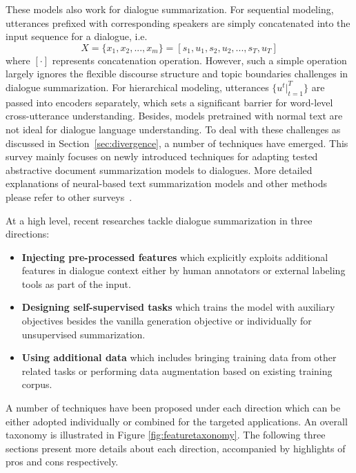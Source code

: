 These models also work for dialogue summarization.  
For sequential modeling, utterances prefixed with corresponding speakers are simply concatenated into the 
input sequence for a dialogue, i.e. 
\begin{equation}
	X = \{x_1, x_2, ..., x_m\} = [s_1, u_1, s_2, u_2, ..., s_T, u_T]
\end{equation}
where $[\cdot]$ represents concatenation operation.
However, such a simple operation largely ignores the flexible discourse structure and topic boundaries challenges in dialogue summarization.
For hierarchical modeling, utterances $\{u^t|_{t=1}^{T}\}$ are passed into encoders separately, which sets a significant barrier for word-level cross-utterance understanding.
Besides, models pretrained with normal text are not ideal for dialogue language understanding. 
To deal with these challenges as discussed in 
Section~\ref{sec:divergence}, a number of techniques have emerged. 
This survey mainly 
focuses on newly introduced techniques for adapting tested abstractive document summarization models to dialogues. 
More detailed explanations of
neural-based text summarization models and other methods please refer to
other surveys~\cite{shi2021neural,syed2021survey}.

At a high level, recent researches tackle dialogue summarization in 
three directions: %
\begin{itemize}
\item \textbf{Injecting pre-processed features} which explicitly exploits additional features in dialogue context either by human annotators or external labeling tools as part of the input.
\item \textbf{Designing self-supervised tasks} which trains the model with auxiliary objectives besides the vanilla generation objective or individually for unsupervised summarization.
\item \textbf{Using additional data} which includes bringing training data from other related tasks or performing data augmentation based on existing training corpus.
\end{itemize}
A number of techniques have been proposed under each direction
which can be either adopted individually or combined for the targeted applications. An overall taxonomy is 
illustrated in Figure \ref{fig:featuretaxonomy}. The following three sections present more details about each direction, accompanied by highlights of pros and cons respectively.

